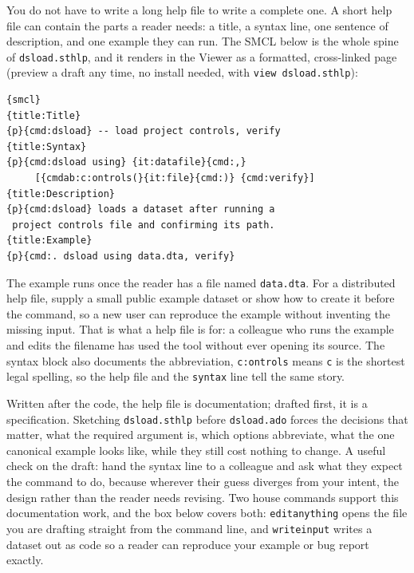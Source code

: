 You do not have to write a long help file to write a complete one. A short help file can contain the parts a reader needs: a title, a syntax line, one sentence of description, and one example they can run. The SMCL below is the whole spine of \texttt{dsload.sthlp}, and it renders in the Viewer as a formatted, cross-linked page (preview a draft any time, no install needed, with \texttt{view dsload.sthlp}):
\par
{\footnotesize
\begin{verbatim}
{smcl}
{title:Title}
{p}{cmd:dsload} -- load project controls, verify
{title:Syntax}
{p}{cmd:dsload using} {it:datafile}{cmd:,}
     [{cmdab:c:ontrols(}{it:file}{cmd:)} {cmd:verify}]
{title:Description}
{p}{cmd:dsload} loads a dataset after running a
 project controls file and confirming its path.
{title:Example}
{p}{cmd:. dsload using data.dta, verify}
\end{verbatim}
}
The example runs once the reader has a file named \texttt{data.dta}. For a distributed help file, supply a small public example dataset or show how to create it before the command, so a new user can reproduce the example without inventing the missing input. That is what a help file is for: a colleague who runs the example and edits the filename has used the tool without ever opening its source. The syntax block also documents the abbreviation, \texttt{c:ontrols} means \texttt{c} is the shortest legal spelling, so the help file and the \texttt{syntax} line tell the same story.

Written after the code, the help file is documentation; drafted first, it is a specification. Sketching \texttt{dsload.sthlp} before \texttt{dsload.ado} forces the decisions that matter, what the required argument is, which options abbreviate, what the one canonical example looks like, while they still cost nothing to change. A useful check on the draft: hand the syntax line to a colleague and ask what they expect the command to do, because wherever their guess diverges from your intent, the design rather than the reader needs revising. Two house commands support this documentation work, and the box below covers both: \texttt{editanything} opens the file you are drafting straight from the command line, and \texttt{writeinput} writes a dataset out as code so a reader can reproduce your example or bug report exactly.

